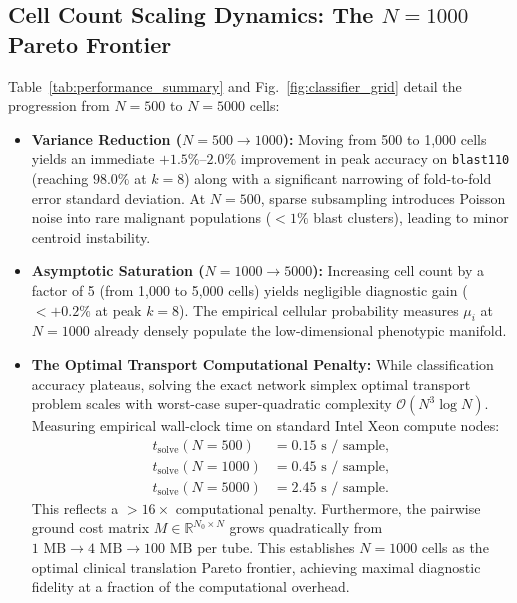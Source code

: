 \documentclass[10pt,journal,compsoc]{IEEEtran}
\begin{document}
\subsection{Cell Count Scaling Dynamics: The \texorpdfstring{$N=1000$}{N=1000} Pareto Frontier}
Table~\ref{tab:performance_summary} and Fig.~\ref{fig:classifier_grid} detail the progression from $N=500$ to $N=5000$ cells:
\begin{itemize}
    \item \textbf{Variance Reduction ($N=500 \to 1000$):} Moving from 500 to 1,000 cells yields an immediate $+1.5\%\text{--}2.0\%$ improvement in peak accuracy on \texttt{blast110} (reaching $98.0\%$ at $k=8$) along with a significant narrowing of fold-to-fold error standard deviation. At $N=500$, sparse subsampling introduces Poisson noise into rare malignant populations ($<1\%$ blast clusters), leading to minor centroid instability.
    \item \textbf{Asymptotic Saturation ($N=1000 \to 5000$):} Increasing cell count by a factor of 5 (from 1,000 to 5,000 cells) yields negligible diagnostic gain ($<+0.2\%$ at peak $k=8$). The empirical cellular probability measures $\mu_i$ at $N=1000$ already densely populate the low-dimensional phenotypic manifold.
    \item \textbf{The Optimal Transport Computational Penalty:} While classification accuracy plateaus, solving the exact network simplex optimal transport problem scales with worst-case super-quadratic complexity $\mathcal{O}(N^3 \log N)$. Measuring empirical wall-clock time on standard Intel Xeon compute nodes:
    \begin{align}
        t_{\text{solve}}(N=500) &= 0.15\text{ s / sample}, \\
        t_{\text{solve}}(N=1000) &= 0.45\text{ s / sample}, \\
        t_{\text{solve}}(N=5000) &= 2.45\text{ s / sample}.
    \end{align}
    This reflects a $>16\times$ computational penalty. Furthermore, the pairwise ground cost matrix $M \in \mathbb{R}^{N_0 \times N}$ grows quadratically from $1\text{ MB} \to 4\text{ MB} \to 100\text{ MB}$ per tube. This establishes $N=1000$ cells as the optimal clinical translation Pareto frontier, achieving maximal diagnostic fidelity at a fraction of the computational overhead.
\end{itemize}

\end{document}
